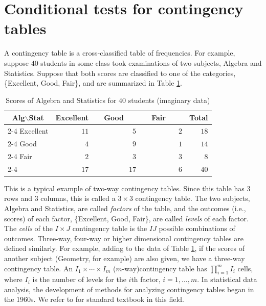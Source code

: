 \documentclass[12pt]{article}
\theoremstyle{definition}
\begin{document}
\section{Conditional tests for contingency tables}
A contingency table is a cross-classified table of frequencies. For
example, suppose $40$ students in some class took examinations of two
subjects, Algebra and Statistics. Suppose that both scores are classified to
one of the categories, \{Excellent, Good, Fair\}, and 
are summarized in Table \ref{tbl:3x3-example}. 
\begin{table}[h]
\begin{center}
\caption{Scores of Algebra and Statistics for $40$ students (imaginary data)}
\label{tbl:3x3-example}
\begin{tabular}{l|r|r|r|r}
\multicolumn{1}{c}{Alg$\backslash$Stat} & \multicolumn{1}{c}{Excellent} & 
\multicolumn{1}{c}{\ \ Good\ \ \ } & \multicolumn{1}{c}{\ \ Fair\ \ \ \
 } & \multicolumn{1}{c}{Total}\\ \cline{2-4} 
Excellent & $11$ & $5$ & $2$ & $18$\\ \cline{2-4}
Good      & $4$  & $9$ & $1$ & $14$\\ \cline{2-4}
Fair      & $2$  & $3$ & $3$ & $8$\\ \cline{2-4}
\multicolumn{1}{l}{Total} & \multicolumn{1}{r}{$17$} &
	 \multicolumn{1}{r}{$17$} &
	     \multicolumn{1}{r}{$6$} & \multicolumn{1}{r}{$40$}
\end{tabular}
\end{center}
\end{table}
This is a typical example of two-way contingency tables. 
Since this table has $3$ rows and $3$ columns, this is
called a $3\times 3$ contingency table. 
The two subjects, Algebra and Statistics, are called {\it factors} of the
table, 
and the outcomes (i.e., scores) of each factor, \{Excellent, Good, Fair\}, are
called {\it levels} of each factor. The {\it cells} of the $I \times J$
contingency table is
the $IJ$ possible combinations of outcomes. 
Three-way, four-way or higher dimensional
contingency tables are defined similarly. 
For example, adding to the data of Table 
\ref{tbl:3x3-example}, if
the scores of another subject (Geometry, for example) are also given, we
have a three-way contingency table. An  
$I_1\times \cdots \times I_m$ ($m$-way)contingency table has 
$\prod_{i=1}^mI_i$ cells, where $I_i$ is the number of levels for the
$i$th factor, $i = 1,\ldots,m$. 
In statistical data analysis, the development of methods for analyzing
contingency tables began in the 1960s. We refer to \cite{Agresti-2013}
for standard textbook in this field.
\end{document}
